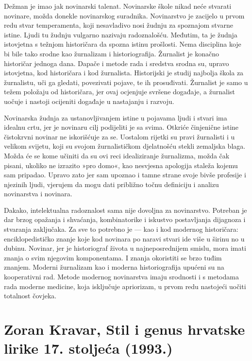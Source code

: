 \documentclass[a4paper,12pt,twoside]{report}
\begin{document}
Dežman je imao jak novinarski talenat. Novinarske škole nikad neće stvarati novinare, možda donekle novinarskog suradnika. Novinarstvo je zacijelo u prvom redu stvar temperamenta, koji nesavladivo nosi žudnju za spoznajom stvarne istine. Ljudi tu žudnju vulgarno nazivaju radoznalošću. Međutim, ta je žudnja istovjetna s težnjom historičara da spozna istinu prošlosti. Nema disciplina koje bi bile tako srodne kao žurnalizam i historiografija. Žurnalist je konačno historičar jednoga dana. Dapače i metode rada i sredstva srodna su, upravo istovjetna, kod historičara i kod žurnalista. Historijski je studij najbolja škola za žurnalistu, uči ga gledati, povezivati pojave, te ih prosuđivati. Žurnalist je samo u težem položaju od historičara, jer ovaj ocjenjuje svršene događaje, a žurnalist uočuje i nastoji ocijeniti događaje u nastajanju i razvoju.

Novinarska žudnja za ustanovljivanjem istine u pojavama ljudi i stvari ima idealnu crtu, jer je novinaru cilj podijeliti je sa svima. Otkriće činjenične istine čistokrvni novinar ne iskorišćuje za se. Uostalom rijetki su pravi žurnalisti i u velikom svijetu, koji su svojom žurnalističkom djelatnošću stekli zemaljska blaga. Možda će se kome učiniti da su ovi reci idealiziranje žurnalizma, možda čak pisani, ukoliko ne izrazito »pro domo«, kao nesvjesna apologija staleža kojemu sam pripadao. Upravo zato jer sam upoznao i tamne strane svoje bivše profesije i njezinih ljudi, vjerujem da mogu dati približno točnu definiciju i analizu novinarstva i novinara.

Dakako, intelektualna radoznalost sama nije dovoljna za novinarstvo. Potreban je dar brzog opažanja i shvaćanja, kombinatorike i iskustvo postavljanja dijagnoza i stvaranja zaključaka. Za sve to potrebno je — kao i kod modernog historičara: enciklopedističko znanje koje kod novinara po naravi stvari ide više u širinu no u dubinu. Novinar, jer je historiograf života u najneposrednijem smislu, mora imati znanja o svim njegovim komponentama. I znanja okoristiti se brzo tuđim znanjem. Moderni žurnalizam kao i moderna historiografija upućeni su na kooperativni rad. Metode modernog novinarstva imaju srodnosti i s metodama rada moderne medicine, koja isključuje apriorizam, u prvom redu nastojeći uočiti totalnost čovjeka.

\chapter[Zoran Kravar, Stil i genus hrvatske lirike]{Zoran Kravar, Stil i genus hrvatske lirike 17. stoljeća (1993.)}
\end{document}
